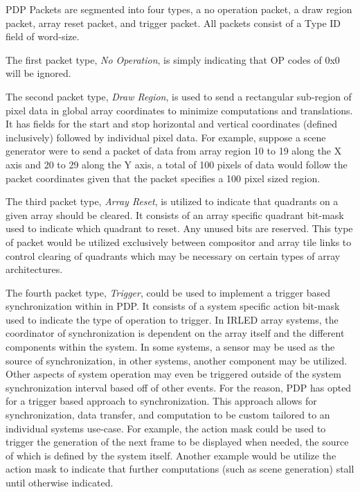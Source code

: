     PDP Packets are segmented into four types, a no operation packet, a draw region packet, array reset packet, and trigger packet. All packets consist of a Type ID field of word-size.

    The first packet type, {\it No Operation}, is simply indicating that OP codes of 0x0 will be ignored.

    The second packet type, {\it Draw Region}, is used to send a rectangular sub-region of pixel data in global array coordinates to minimize computations and translations. It has fields for the start and stop horizontal and vertical coordinates (defined inclusively) followed by individual pixel data. For example, suppose a scene generator were to send a packet of data from array region 10 to 19 along the X axis and 20 to 29 along the Y axis, a total of 100 pixels of data would follow the packet coordinates given that the packet specifies a 100 pixel sized region.

    The third packet type, {\it Array Reset}, is utilized to indicate that quadrants on a given array should be cleared. It consists of an array specific quadrant bit-mask used to indicate which quadrant to reset. Any unused bits are reserved. This type of packet would be utilized exclusively between compositor and array tile links to control clearing of quadrants which may be necessary on certain types of array architectures.

    The fourth packet type, {\it Trigger}, could be used to implement a trigger based synchronization within in PDP. It consists of a system specific action bit-mask used to indicate the type of operation to trigger. In IRLED array systems, the coordinator of synchronization is dependent on the array itself and the different components within the system. In some systems, a sensor may be used as the source of synchronization, in other systems, another component may be utilized. Other aspects of system operation may even be triggered outside of the system synchronization interval based off of other events. For the reason, PDP has opted for a trigger based approach to synchronization. This approach allows for synchronization, data transfer, and computation to be custom tailored to an individual systems use-case. For example, the action mask could be used to trigger the generation of the next frame to be displayed when needed, the source of which is defined by the system itself. Another example would be utilize the action mask to indicate that further computations (such as scene generation) stall until otherwise indicated.


